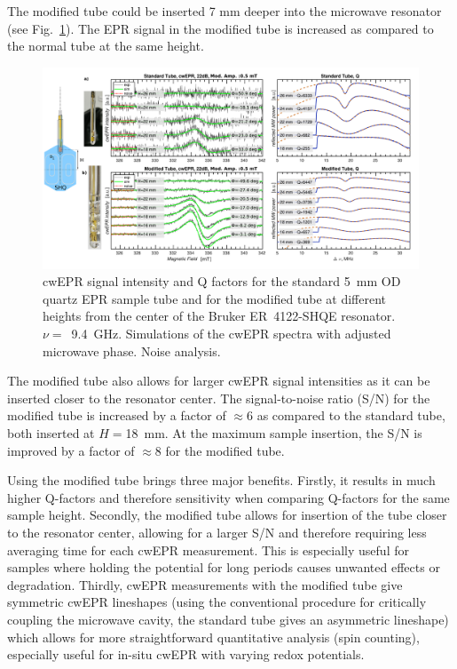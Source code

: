 The modified tube could be inserted 7 mm deeper into the microwave resonator (see Fig.~\ref{fig:S2_Qfactor}). The EPR signal in the modified tube is increased as compared to the normal tube at the same height.

\begin{figure}[h]
\centering
\includegraphics[width=1\textwidth]{./operando_epr/figures/spins_at_work/Figure_S2.pdf}
\caption{cwEPR signal intensity and Q factors for the standard 5~mm OD quartz EPR sample tube and for the modified tube at different heights from the center of the Bruker ER~4122-SHQE resonator. $\nu=$~9.4~GHz. Simulations of the cwEPR spectra with adjusted microwave phase. Noise analysis.}
\label{fig:S2_Qfactor}
\end{figure}

\par
The modified tube also allows for larger cwEPR signal intensities as it can be inserted closer to the resonator center. The signal-to-noise ratio (S/N) for the modified tube is increased by a factor of $\approx$6 as compared to the standard tube, both inserted at $H=$18~mm. At the maximum sample insertion, the S/N is improved by a factor of $\approx$8 for the modified tube.
\par
Using the modified tube brings three major benefits. Firstly, it results in much higher Q-factors and therefore sensitivity when comparing Q-factors for the same sample height. Secondly, the modified tube allows for insertion of the tube closer to the resonator center, allowing for a larger S/N and therefore requiring less averaging time for each cwEPR measurement. This is especially useful for samples where holding the potential for long periods causes unwanted effects or degradation. Thirdly, cwEPR measurements with the modified tube give symmetric cwEPR lineshapes (using the conventional procedure for critically coupling the microwave cavity, the standard tube gives an asymmetric lineshape) which allows for more straightforward quantitative analysis (spin counting), especially useful for in-situ cwEPR with varying redox potentials.







